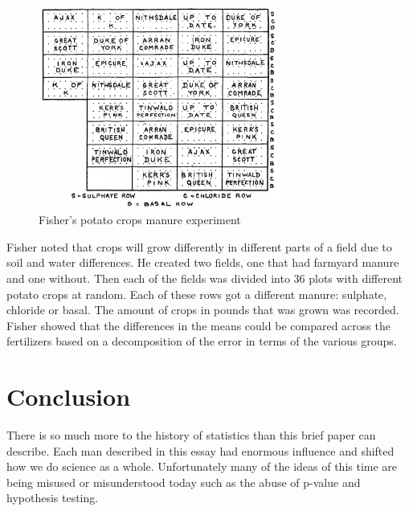 \documentclass{article}
\begin{document}
\begin{figure}[h!]
\caption{Fisher's potato crops manure experiment \cite{crop_var_2} }
\includegraphics[width=8cm]{fisher_crop_variation.png}
\centering
\end{figure}

Fisher noted that crops will grow differently in different parts of a field due to soil and water differences.
He created two fields, one that had farmyard manure and one without.
Then each of the fields was divided into 36 plots with different potato crops at random.
Each of these rows got a different manure: sulphate, chloride or basal.
The amount of crops in pounds that was grown was recorded.
Fisher showed that the differences in the means could be compared across the fertilizers based on a decomposition of the error in terms of the various groups.

\section{Conclusion}
There is so much more to the history of statistics than this brief paper can describe.
Each man described in this essay had enormous influence and shifted how we do science as a whole.
Unfortunately many of the ideas of this time are being misused or misunderstood today such as the abuse of p-value and hypothesis testing.



\end{document}
